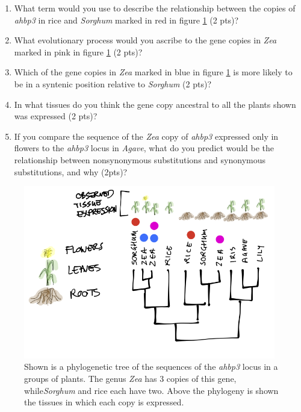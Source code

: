 \documentclass[]{article}
\begin{document}
\begin{enumerate}
\begin{enumerate}
\item What term would you use to describe the relationship between the copies of \emph{ahbp3} in rice and \emph{Sorghum} marked in red in figure \ref{duplicates}  (2 pts)?
\item What evolutionary process would you ascribe to the gene copies in  \emph{Zea} marked in pink in figure \ref{duplicates} (2 pts)?
\item Which of the gene copies in \emph{Zea} marked in blue in figure \ref{duplicates} is more likely to be in a syntenic position relative to \emph{Sorghum} (2 pts)?
\item In what tissues do you think the gene copy ancestral to all the plants shown was expressed (2 pts)?
\item If you compare the sequence of the \emph{Zea }copy of \emph{ahbp3} expressed only in flowers to the \emph{ahbp3} locus in \emph{Agave}, what do you predict would be the relationship between nonsynonymous substitutions and synonymous substitutions, and why (2pts)?


\end{enumerate}


\begin{figure}[h!]
  \begin{center}
   \includegraphics[width=110mm]{images/examfig2.png}
    \caption{Shown is a phylogenetic tree of the sequences of the \emph{ahbp3} locus in a groups of plants. The genus \emph{Zea} has 3 copies of this gene, while\emph{Sorghum} and rice each have two. Above the phylogeny is shown the tissues in which each copy is expressed. } 
\label{duplicates}
  \end{center}
\end{figure}


\end{enumerate}
\end{document}
